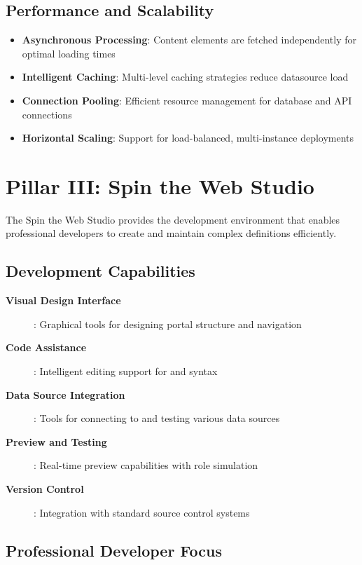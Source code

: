 \subsection{Performance and Scalability}

\begin{itemize}
    \item \textbf{Asynchronous Processing}: Content elements are fetched independently for optimal loading times
    \item \textbf{Intelligent Caching}: Multi-level caching strategies reduce datasource load
    \item \textbf{Connection Pooling}: Efficient resource management for database and API connections
    \item \textbf{Horizontal Scaling}: Support for load-balanced, multi-instance deployments
\end{itemize}

\section{Pillar III: Spin the Web Studio}
\label{sec:pillar-studio}

The Spin the Web Studio provides the development environment that enables professional developers to create and maintain complex \webbase{} definitions efficiently.

\subsection{Development Capabilities}

\begin{description}
\item[\textbf{Visual Design Interface}]: Graphical tools for designing portal structure and navigation
\item[\textbf{Code Assistance}]: Intelligent editing support for \wbdl{} and \wbpl{} syntax
\item[\textbf{Data Source Integration}]: Tools for connecting to and testing various data sources
\item[\textbf{Preview and Testing}]: Real-time preview capabilities with role simulation
\item[\textbf{Version Control}]: Integration with standard source control systems
\end{description}

\subsection{Professional Developer Focus}

